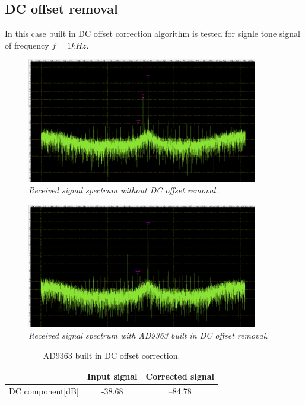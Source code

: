 \documentclass[en,printmode]{mgr}
\begin{document}
		\subsection*{DC offset removal}
	 	In this case built in DC offset correction algorithm is tested for signle tone
		signal of frequency $f=1kHz$.				
   		 	\begin{figure}[!htb]
    			\centering
   				\includegraphics[width=0.9\textwidth]{plots/real_dcoff.png}
   		 		\caption{\textit{Received signal spectrum without DC offset removal.}}
   		 	\end{figure}
   		 	\begin{figure}[!htb]
    			\centering
   				\includegraphics[width=0.9\textwidth]{plots/real_dcon.png}
   		 		\caption{\textit{Received signal spectrum with AD9363 built in DC offset removal.}}
   		 	\end{figure}
   		 	
   		 	\begin{table}[H]
\centering
\caption{AD9363 built in DC offset correction.}
\begin{tabular}{|c|c|c|}
\hline
                     & Input signal & Corrected signal \\ \hline
DC component{[}dB{]} & -38.68       & --84.78          \\ \hline
\end{tabular}
\end{table}
\end{document}
